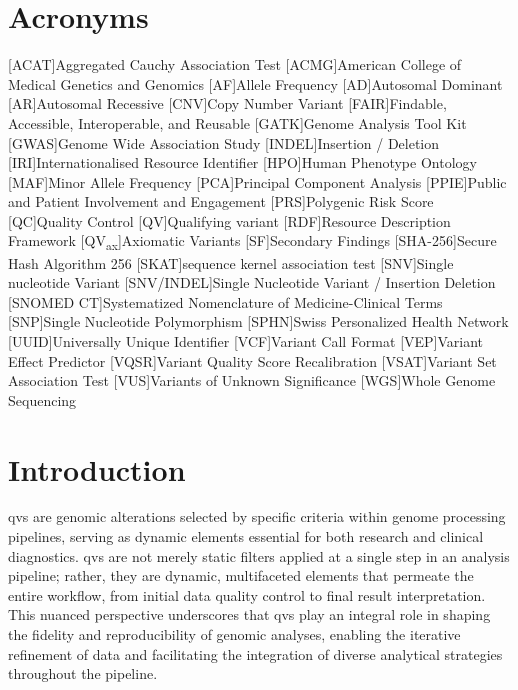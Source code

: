 \section*{Acronyms}
\renewenvironment{description}
{\list{}{\labelwidth0pt\itemindent-\leftmargin
    \parsep-1em\itemsep0pt\let\makelabel\descriptionlabel}}
               {\endlist}
\begin{acronym} 
 [ACAT]{Aggregated Cauchy Association Test }
 [ACMG]{American College of Medical Genetics and Genomics}
 [AF]{Allele Frequency}
 [AD]{Autosomal Dominant}
 [AR]{Autosomal Recessive}
  [CNV]{Copy Number Variant}
 [FAIR]{Findable, Accessible, Interoperable, and Reusable}
 [GATK]{Genome Analysis Tool Kit}
 [GWAS]{Genome Wide Association Study}
 [INDEL]{Insertion / Deletion}
 [IRI]{Internationalised Resource Identifier}
 [HPO]{Human Phenotype Ontology}
 [MAF]{Minor Allele Frequency}
  [PCA]{Principal Component Analysis} 
 [PPIE]{Public and Patient Involvement and Engagement}
 [PRS]{Polygenic Risk Score} 
 [QC]{Quality Control}
 [QV]{Qualifying variant}
 [RDF]{Resource Description Framework}
 [QV\textsubscript{ax}]{Axiomatic Variants}
 [SF]{Secondary Findings}
 [SHA-256]{Secure Hash Algorithm 256}
 [SKAT]{sequence kernel association test} 
 [SNV]{Single nucleotide Variant}
  [SNV/INDEL]{Single Nucleotide Variant / Insertion Deletion}
  [SNOMED CT]{Systematized Nomenclature of Medicine-Clinical Terms}
 [SNP]{Single Nucleotide Polymorphism}
 [SPHN]{Swiss Personalized Health Network}
 [UUID]{Universally Unique Identifier}
 [VCF]{Variant Call Format}
  [VEP]{Variant Effect Predictor}
 [VQSR]{Variant Quality Score Recalibration}
 [VSAT]{Variant Set Association Test}
 [VUS]{Variants of Unknown Significance}
 [WGS]{Whole Genome Sequencing}
\end{acronym}

\clearpage

\section{Introduction}
\label{sec:intro}

\ac{qv}s are genomic alterations selected by specific criteria within genome processing pipelines, serving as dynamic elements essential for both research and clinical diagnostics. 
\ac{qv}s are not merely static filters applied at a single step in an analysis pipeline; rather, they are dynamic, multifaceted elements that permeate the entire workflow, from initial data quality control to final result interpretation. This nuanced perspective underscores that \ac{qv}s play an integral role in shaping the fidelity and reproducibility of genomic analyses, enabling the iterative refinement of data and facilitating the integration of diverse analytical strategies throughout the pipeline.

